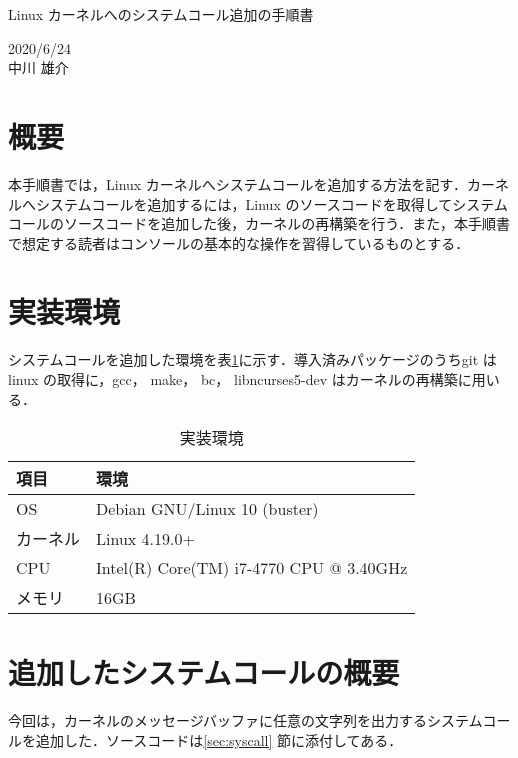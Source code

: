 \documentclass[12pt]{jsarticle}
\begin{document}
\begin{center}
{\LARGE Linux カーネルへのシステムコール追加の手順書}
\end{center}

\begin{flushright}
  2020/6/24\\
  中川 雄介
\end{flushright}
\section{概要}\label{sec:hajime}
\label{sec:introduction}
本手順書では，Linux カーネルへシステムコールを追加する方法を記す．カーネルへシステムコールを追加するには，Linux のソースコードを取得してシステムコールのソースコードを追加した後，カーネルの再構築を行う．また，本手順書で想定する読者はコンソールの基本的な操作を習得しているものとする．

\section{実装環境}\label{sec:env}
システムコールを追加した環境を表\ref{tab:1}に示す．導入済みパッケージのうちgit はlinux の取得に，gcc， make， bc， libncurses5-dev はカーネルの再構築に用いる．
\begin{table}[h]
  \begin{center}
    \caption{実装環境}\label{tab:1}
    \begin{tabular}{l|l}
      \hline\hline
      \multicolumn{1}{l|}{項目} & \multicolumn{1}{l}{環境}\\
      \hline
      OS & Debian GNU/Linux 10 (buster) \\
      カーネル & Linux 4.19.0+\\
      CPU & Intel(R) Core(TM) i7-4770 CPU @ 3.40GHz\\
      メモリ & 16GB\\
      \hline
    \end{tabular}
  \end{center}
\end{table}

\section{追加したシステムコールの概要}\label{sec:gaiyou}
今回は，カーネルのメッセージバッファに任意の文字列を出力するシステムコールを追加した．ソースコードは\ref{sec:syscall} 節に添付してある．
\end{document}
